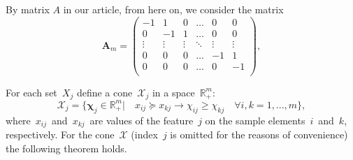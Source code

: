 \documentclass[12pt,preprint]{elsarticle}
\newcommand{\bA}{\mathbf{A}}
\newcommand{\bchi}{\boldsymbol{\chi}}
\begin{document}
By matrix $A$ in our article, from here on, we consider the matrix
\[
\bA_m=
\begin{pmatrix}
-1 & 1 & 0 & \dots & 0 & 0 \\
0 & -1 & 1 & \dots & 0 & 0 \\
\vdots & \vdots & \vdots & \ddots & \vdots & \vdots \\
0 & 0 & 0 & \dots & -1 & 1 \\
0 & 0 & 0 & \dots & 0 & -1 \\
\end{pmatrix},
\]

For each set~$X_j$ define a cone~$\mathcal{X}_j$ in a space~$\mathbb{R}^m_+$:
\begin{equation}
\mathcal{X}_j=\{\bchi_j\in\mathbb{R}^m_+|\quad x_{ij}\succeq x_{kj}\rightarrow \chi_{ij}\geq \chi_{kj}\quad \forall i,k=1,...,m\},
\label{ConeDef}
\end{equation}
where~$x_{ij}$~and~$x_{kj}$~are values of the feature~$j$ on the sample elements~$i$~and~$k$, respectively.
For the cone~$\mathcal{X}$ (index~$j$ is omitted for the reasons of convenience) the following theorem holds.
\end{document}
